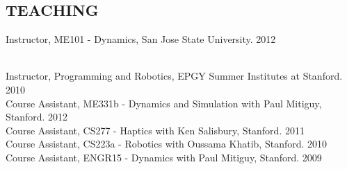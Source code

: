\documentclass[line,margin]{res}
\newcommand{\CVOnly}[1]{}
\newcommand{\CVOnly}[1]{#1}
\begin{document}
\begin{resume}
\section{TEACHING} 
\vspace{1.0pc}
Instructor, ME101 - Dynamics, San Jose State University\CVOnly{, 49 students}. \hfill {} \CVOnly{Fall }2012%
\CVOnly{\\[0.0pc]Instructor, ME101 - Dynamics, San Jose State University, 56 students. \hfill Fall 2011}
\\[0.0pc] Instructor, Programming and Robotics, EPGY Summer Institutes at Stanford. \hfill \CVOnly{Summer} 
2010
\\[0.4pc] Course Assistant, ME331b - Dynamics and Simulation with Paul Mitiguy, Stanford. \hfill \CVOnly{Spring} 2012
\\[0.0pc] Course Assistant, CS277 - Haptics with Ken Salisbury, Stanford. \hfill \CVOnly{Winter}
2011
\\[0.0pc] Course Assistant, CS223a - Robotics with Oussama Khatib, Stanford. \hfill \CVOnly{Winter} 
2010 
\\[0.0pc] Course Assistant, ENGR15 - Dynamics with Paul Mitiguy, Stanford. \hfill \CVOnly{Fall}
2009 
%
%

\end{resume}
\end{document}
